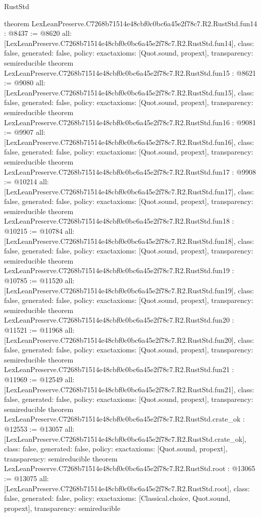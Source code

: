 \begin{lexlean}{RustStd}
\begin{coremodule}
{}
theorem LexLeanPreserve.C7268b71514e48cbf0c0bc6a45e2f78c7.R2.RustStd.fun14 : @8437 := @8620 {
  all: [LexLeanPreserve.C7268b71514e48cbf0c0bc6a45e2f78c7.R2.RustStd.fun14],
  class: false,
  generated: false,
  policy: exact{axioms: [Quot.sound, propext]},
  transparency: semireducible
}
theorem LexLeanPreserve.C7268b71514e48cbf0c0bc6a45e2f78c7.R2.RustStd.fun15 : @8621 := @9080 {
  all: [LexLeanPreserve.C7268b71514e48cbf0c0bc6a45e2f78c7.R2.RustStd.fun15],
  class: false,
  generated: false,
  policy: exact{axioms: [Quot.sound, propext]},
  transparency: semireducible
}
theorem LexLeanPreserve.C7268b71514e48cbf0c0bc6a45e2f78c7.R2.RustStd.fun16 : @9081 := @9907 {
  all: [LexLeanPreserve.C7268b71514e48cbf0c0bc6a45e2f78c7.R2.RustStd.fun16],
  class: false,
  generated: false,
  policy: exact{axioms: [Quot.sound, propext]},
  transparency: semireducible
}
theorem LexLeanPreserve.C7268b71514e48cbf0c0bc6a45e2f78c7.R2.RustStd.fun17 : @9908 := @10214 {
  all: [LexLeanPreserve.C7268b71514e48cbf0c0bc6a45e2f78c7.R2.RustStd.fun17],
  class: false,
  generated: false,
  policy: exact{axioms: [Quot.sound, propext]},
  transparency: semireducible
}
theorem LexLeanPreserve.C7268b71514e48cbf0c0bc6a45e2f78c7.R2.RustStd.fun18 : @10215 := @10784 {
  all: [LexLeanPreserve.C7268b71514e48cbf0c0bc6a45e2f78c7.R2.RustStd.fun18],
  class: false,
  generated: false,
  policy: exact{axioms: [Quot.sound, propext]},
  transparency: semireducible
}
theorem LexLeanPreserve.C7268b71514e48cbf0c0bc6a45e2f78c7.R2.RustStd.fun19 : @10785 := @11520 {
  all: [LexLeanPreserve.C7268b71514e48cbf0c0bc6a45e2f78c7.R2.RustStd.fun19],
  class: false,
  generated: false,
  policy: exact{axioms: [Quot.sound, propext]},
  transparency: semireducible
}
theorem LexLeanPreserve.C7268b71514e48cbf0c0bc6a45e2f78c7.R2.RustStd.fun20 : @11521 := @11968 {
  all: [LexLeanPreserve.C7268b71514e48cbf0c0bc6a45e2f78c7.R2.RustStd.fun20],
  class: false,
  generated: false,
  policy: exact{axioms: [Quot.sound, propext]},
  transparency: semireducible
}
theorem LexLeanPreserve.C7268b71514e48cbf0c0bc6a45e2f78c7.R2.RustStd.fun21 : @11969 := @12549 {
  all: [LexLeanPreserve.C7268b71514e48cbf0c0bc6a45e2f78c7.R2.RustStd.fun21],
  class: false,
  generated: false,
  policy: exact{axioms: [Quot.sound, propext]},
  transparency: semireducible
}
theorem LexLeanPreserve.C7268b71514e48cbf0c0bc6a45e2f78c7.R2.RustStd.crate_ok : @12553 := @13057 {
  all: [LexLeanPreserve.C7268b71514e48cbf0c0bc6a45e2f78c7.R2.RustStd.crate_ok],
  class: false,
  generated: false,
  policy: exact{axioms: [Quot.sound, propext]},
  transparency: semireducible
}
theorem LexLeanPreserve.C7268b71514e48cbf0c0bc6a45e2f78c7.R2.RustStd.root : @13065 := @13075 {
  all: [LexLeanPreserve.C7268b71514e48cbf0c0bc6a45e2f78c7.R2.RustStd.root],
  class: false,
  generated: false,
  policy: exact{axioms: [Classical.choice, Quot.sound, propext]},
  transparency: semireducible
}


\end{coremodule}
\end{lexlean}
